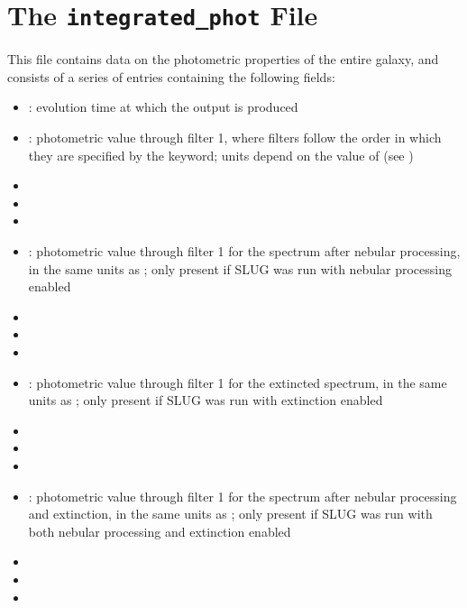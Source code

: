 \documentclass[letterpaper,10pt,english]{sphinxmanual}
\begin{document}
\section{The \texttt{integrated\_phot} File}
\label{output:the-integrated-phot-file}\label{output:ssec-int-phot-file}
This file contains data on the photometric properties of the entire galaxy, and consists of a series of entries containing the following fields:
\begin{itemize}
\item {} 
: evolution time at which the output is produced

\item {} 
: photometric value through filter 1, where filters follow the order in which they are specified by the  keyword; units depend on the value of  (see {\hyperref[parameters:ssec-phot-keywords]{\emph{}}})

\item {} 

\item {} 

\item {} 

\item {} 
: photometric value through filter 1 for the spectrum after nebular processing, in the same units as ; only present if SLUG was run with nebular processing enabled

\item {} 

\item {} 

\item {} 

\item {} 
: photometric value through filter 1 for the extincted spectrum, in the same units as ; only present if SLUG was run with extinction enabled

\item {} 

\item {} 

\item {} 

\item {} 
: photometric value through filter 1 for the spectrum after nebular processing and extinction, in the same units as ; only present if SLUG was run with both nebular processing and extinction enabled

\item {} 

\item {} 

\item {} 

\end{itemize}
\end{document}
